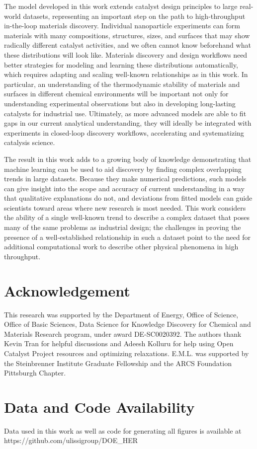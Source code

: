 \documentclass[preprint,12pt]{elsarticle}
\begin{document}
The model developed in this work extends catalyst design principles to large real-world datasets, representing an important step on the path to high-throughput in-the-loop materials discovery. Individual nanoparticle experiments can form materials with many compositions, structures, sizes, and surfaces that may show radically different catalyst activities, and we often cannot know beforehand what these distributions will look like. Materials discovery and design workflows need better strategies for modeling and learning these distributions automatically, which requires adapting and scaling well-known relationships as in this work. In particular, an understanding of the thermodynamic stability of materials and surfaces in different chemical environments will be important not only for understanding experimental observations but also in developing long-lasting catalysts for industrial use. Ultimately, as more advanced models are able to fit gaps in our current analytical understanding, they will ideally be integrated with experiments in closed-loop discovery workflows, accelerating and systematizing catalysis science.

The result in this work adds to a growing body of knowledge demonstrating that machine learning can be used to aid discovery by finding complex overlapping trends in large datasets. Because they make numerical predictions, such models can give insight into the scope and accuracy of current understanding in a way that qualitative explanations do not, and deviations from fitted models can guide scientists toward areas where new research is most needed. This work considers the ability of a single well-known trend to describe a complex dataset that poses many of the same problems as industrial design; the challenges in proving the presence of a well-established relationship in such a dataset point to the need for additional computational work to describe other physical phenomena in high throughput.


\section{Acknowledgement}
This research was supported by the Department of Energy, Office of Science, Office of Basic Sciences, Data Science for Knowledge Discovery for Chemical and Materials Research program, under award DE-SC0020392. The authors thank Kevin Tran for helpful discussions and Adeesh Kolluru for help using Open Catalyst Project resources and optimizing relaxations. E.M.L. was supported by the Steinbrenner Institute Graduate Fellowship and the ARCS Foundation Pittsburgh Chapter.

\section{Data and Code Availability}
Data used in this work as well as code for generating all figures is available at https://github.com/ulissigroup/DOE\_HER


 


\appendix

\end{document}
